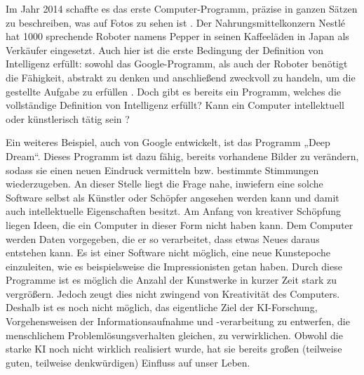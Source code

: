 Im Jahr 2014 schaffte es das erste Computer-Programm, präzise in ganzen Sätzen zu beschreiben, was auf Fotos zu sehen ist \cite{donahue2014}.  Der Nahrungsmittelkonzern Nestlé hat 1000 sprechende Roboter namens Pepper in seinen Kaffeeläden in Japan als Verkäufer eingesetzt.  Auch hier ist die erste Bedingung der Definition von Intelligenz erfüllt: sowohl das Google-Programm, als auch der Roboter benötigt die Fähigkeit, abstrakt zu denken und anschließend zweckvoll zu handeln, um die gestellte Aufgabe zu erfüllen \cite{Spiegel_2}. 
Doch gibt es bereits ein Programm, welches die vollständige Definition von Intelligenz erfüllt? Kann ein Computer intellektuell oder künstlerisch tätig sein \cite{BildDerWissenschaft_1}?

Ein weiteres Beispiel, auch von Google entwickelt, ist das Programm „Deep Dream“. Dieses Programm ist dazu fähig, bereits vorhandene Bilder zu verändern, sodass sie einen neuen Eindruck vermitteln bzw. bestimmte Stimmungen wiederzugeben.  An dieser Stelle liegt die Frage nahe, inwiefern eine solche Software selbst als Künstler oder Schöpfer angesehen werden kann und damit auch intellektuelle Eigenschaften besitzt. Am Anfang von kreativer Schöpfung liegen Ideen, die ein Computer in dieser Form nicht haben kann. Dem Computer werden Daten vorgegeben, die er so verarbeitet, dass etwas Neues daraus entstehen kann. Es ist einer Software nicht möglich, eine neue Kunstepoche einzuleiten, wie es beispielsweise die Impressionisten getan haben.
Durch diese Programme ist es möglich die Anzahl der Kunstwerke in kurzer Zeit stark zu vergrößern. Jedoch zeugt dies nicht zwingend von Kreativität des Computers. Deshalb ist es noch nicht möglich, das eigentliche Ziel der KI-Forschung, Vorgehensweisen der Informationsaufnahme und -verarbeitung zu entwerfen, die menschlichem Problemlösungsverhalten gleichen, zu verwirklichen. Obwohl die starke KI noch nicht wirklich realisiert wurde, hat sie bereits großen (teilweise guten, teilweise denkwürdigen) Einfluss auf unser Leben.

